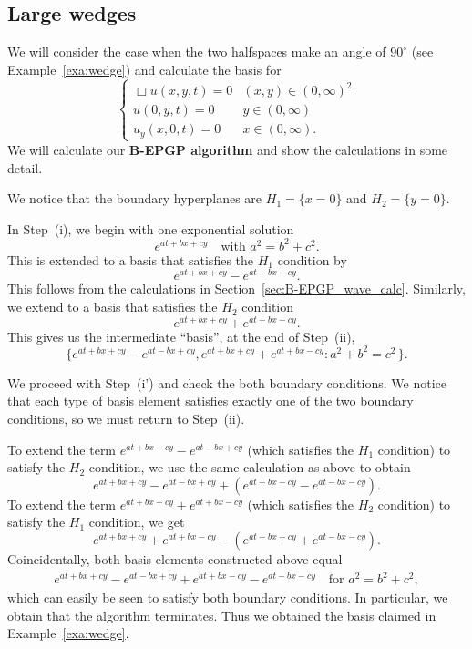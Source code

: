 \documentclass{article} %
\theoremstyle{plain}
\theoremstyle{definition}
\theoremstyle{remark}
\begin{document}
\subsection{Large wedges}\label{sec:wedge_90deg}  
We will consider the case when the two halfspaces make an angle of $90^\circ$ (see Example~\ref{exa:wedge}) and calculate the basis for
$$
  \begin{cases}
        \Box u(x,y,t)=0&(x,y)\in(0,\infty)^2\\
        u(0,y,t)=0& y\in(0,\infty)\\
        u_y(x,0,t)=0 &x\in(0,\infty).
    \end{cases}
$$
We will calculate our \textbf{B-EPGP algorithm} and show the calculations in some detail.

We notice that the boundary hyperplanes are $H_1=\{x=0\}$ and $H_2=\{y=0\}$. 

In Step~(i), we begin with one exponential solution
$$
e^{at+bx+cy}\quad\text{with }a^2=b^2+c^2.
$$
This is extended to a basis that satisfies the $H_1$ condition by
$$
e^{at+bx+cy}-e^{at-bx+cy}.
$$
This follows from the calculations in Section~\ref{sec:B-EPGP_wave_calc}. Similarly, we extend to a basis that satisfies the $H_2$ condition
$$
e^{at+bx+cy}+e^{at+bx-cy}.
$$
This gives us the intermediate ``basis'', at the end of Step~(ii),
$$
\{e^{at+bx+cy}-e^{at-bx+cy},e^{at+bx+cy}+e^{at+bx-cy}\colon a^2+b^2=c^2\,\}.
$$

We proceed with Step~(i') and check the both boundary conditions. We notice that each type of basis element satisfies exactly one of the two boundary conditions, so we must return to Step~(ii).

To extend the term $e^{at+bx+cy}-e^{at-bx+cy}$ (which satisfies the $H_1$ condition) to satisfy the $H_2$ condition, we use the same calculation as above to obtain
$$
e^{at+bx+cy}-e^{at-bx+cy}+(e^{at+bx-cy}-e^{at-bx-cy}).
$$
To extend the term $e^{at+bx+cy}+e^{at+bx-cy}$ (which satisfies the $H_2$ condition) to satisfy the $H_1$ condition, we get
$$
e^{at+bx+cy}+e^{at+bx-cy}-(e^{at-bx+cy}+e^{at-bx-cy}).
$$
Coincidentally, both basis elements constructed above equal
\begin{align}\label{eq:basis_wedge_90deg}
e^{at+bx+cy}-e^{at-bx+cy}+e^{at+bx-cy}-e^{at-bx-cy}\quad\text{for }a^2=b^2+c^2,
\end{align}
which can easily be seen to satisfy both boundary conditions. In particular, we obtain that the algorithm terminates. Thus we obtained the basis claimed in Example~\ref{exa:wedge}.
\end{document}
